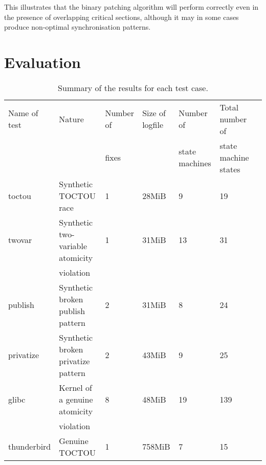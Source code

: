 \documentclass[10pt,twocolumn,preprint,natbib,authoryear]{sigplanconf}
\begin{document}
This illustrates that the binary patching algorithm will perform
correctly even in the presence of overlapping critical sections,
although it may in some cases produce non-optimal synchronisation
patterns.

\section{Evaluation}
\label{sect:evaluation}

\begin{table*}
\begin{tabular}{lllllll}
Name of test & Nature                 & Number of & Size of logfile & Number of & Total number of \\
             &                        & fixes     &                 & state machines & state machine states \\ \hline
toctou       & Synthetic TOCTOU race  & 1        & 28MiB   & 9 & 19\\
twovar       & Synthetic two-variable atomicity & 1        & 31MiB   & 13 & 31\\
             & violation    &          & \\
publish      & Synthetic broken publish pattern & 2        & 31MiB   & 8 & 24 \\
privatize    & Synthetic broken privatize pattern & 2        & 43MiB   & 9 & 25 \\
\hline
glibc        & Kernel of a genuine atomicity & 8        & 48MiB   & 19 & 139\\
             & violation    &          & \\
\hline
thunderbird  & Genuine TOCTOU         & 1        & 758MiB  & 7 & 15
\end{tabular}
\caption{Summary of the results for each test case.}
\label{tab:output_summary}
\end{table*}
\end{document}
